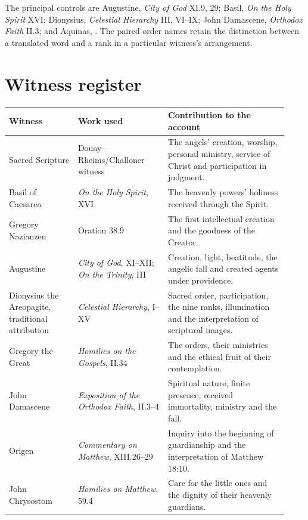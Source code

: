 The principal controls are Augustine, \emph{City of God} XI.9, 29;
Basil, \emph{On the Holy Spirit} XVI; Dionysius, \emph{Celestial Hierarchy}
III, VI--IX; John Damascene, \emph{Orthodox Faith} II.3; and Aquinas,
. The paired order names retain the distinction
between a translated word and a rank in a particular witness's arrangement.

\section{Witness register}
\label{app:witnesses}

\begin{longtable}{@{}>{\raggedright\arraybackslash}p{0.23\linewidth}>{\raggedright\arraybackslash}p{0.30\linewidth}>{\raggedright\arraybackslash}p{0.40\linewidth}@{}}
\toprule
Witness & Work used & Contribution to the account\\
\midrule\endhead
Sacred Scripture & Douay--Rheims/Challoner witness & The angels' creation,
worship, personal ministry, service of Christ and participation in judgment.\\
Basil of Caesarea & \emph{On the Holy Spirit}, XVI & The heavenly powers'
holiness received through the Spirit.\\
Gregory Nazianzen & Oration 38.9 & The first intellectual creation and the
goodness of the Creator.\\
Augustine & \emph{City of God}, XI--XII; \emph{On the Trinity}, III &
Creation, light, beatitude, the angelic fall and created agents under providence.\\
Dionysius the Areopagite, traditional attribution & \emph{Celestial Hierarchy},
I--XV & Sacred order, participation, the nine ranks, illumination and
the interpretation of scriptural images.\\
Gregory the Great & \emph{Homilies on the Gospels}, II.34 & The orders,
their ministries and the ethical fruit of their contemplation.\\
John Damascene & \emph{Exposition of the Orthodox Faith}, II.3--4 &
Spiritual nature, finite presence, received immortality, ministry and the fall.\\
Origen & \emph{Commentary on Matthew}, XIII.26--29 & Inquiry into the
beginning of guardianship and the interpretation of Matthew 18:10.\\
John Chrysostom & \emph{Homilies on Matthew}, 59.4 & Care for the little
ones and the dignity of their heavenly guardians.\\

\end{longtable}
